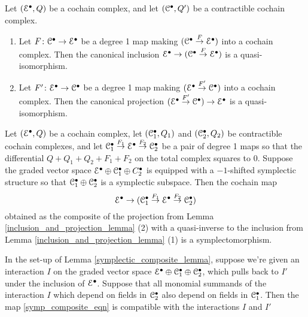 \documentclass[10pt, oneside]{article}
\begin{document}
\begin{lemma} \label{inclusion_and_projection_lemma}
Let $(\mathcal{E}^\bullet, Q)$ be a cochain complex, and let $(\mathcal{C}^\bullet, Q')$ be a contractible cochain complex.
\begin{enumerate}
 \item Let $F \colon \mathcal{C}^\bullet \to \mathcal{E}^\bullet$ be a degree 1 map making $(\mathcal{C}^\bullet \overset F\to \mathcal{E}^\bullet)$ into a cochain complex.  Then the canonical inclusion $\mathcal{E}^\bullet \to (\mathcal{C}^\bullet \overset F\to \mathcal{E}^\bullet)$ is a quasi-isomorphism.
 \item Let $F' \colon \mathcal{E}^\bullet \to \mathcal{C}^\bullet$ be a degree 1 map making $(\mathcal{E}^\bullet \overset {F'}\to \mathcal{C}^\bullet)$ into a cochain complex.  Then the canonical projection $(\mathcal{E}^\bullet \overset {F'}\to \mathcal{C}^\bullet) \to \mathcal{E}^\bullet$ is a quasi-isomorphism.
\end{enumerate}
\end{lemma}

\begin{lemma} \label{symplectic_composite_lemma}
Let $(\mathcal{E}^\bullet,Q)$ be a cochain complex, let $(\mathcal{C}_1^\bullet, Q_1)$ and $(\mathcal{C}_2^\bullet, Q_2)$ be contractible cochain complexes, and let $\mathcal{C}_1^\bullet \overset{F_1}\to \mathcal{E}^\bullet \overset{F_2}\to \mathcal{C}_2^\bullet$ be a pair of degree 1 maps so that the differential $Q + Q_1 + Q_2 + F_1 + F_2$ on the total complex squares to 0.  Suppose the graded vector space $\mathcal{E}^\bullet \oplus \mathcal{C}_1^\bullet \oplus C_2^\bullet$ is equipped with a $-1$-shifted symplectic structure so that $\mathcal{C}_1^\bullet \oplus \mathcal{C}_2^\bullet$ is a symplectic subspace.  Then the cochain map 
\begin{equation}
\label{symp_composite_eqn}\mathcal{E}^\bullet \to (\mathcal{C}_1^\bullet \overset{F_1}\to \mathcal{E}^\bullet \overset{F_2}\to \mathcal{C}_2^\bullet)
\end{equation}
obtained as the composite of the projection from Lemma \ref{inclusion_and_projection_lemma} (2) with a quasi-inverse to the inclusion from Lemma \ref{inclusion_and_projection_lemma} (1) is a symplectomorphism.
\end{lemma}

\begin{lemma} \label{interaction_pullback_lemma}
In the set-up of Lemma \ref{symplectic_composite_lemma}, suppose we're given an interaction $I$ on the graded vector space $\mathcal{E}^\bullet \oplus \mathcal{C}_1^\bullet \oplus \mathcal{C}_2^\bullet$, which pulls back to $I'$ under the inclusion of $\mathcal{E}^\bullet$.  Suppose that all monomial summands of the interaction $I$ which depend on fields in $\mathcal{C}_2^\bullet$ also depend on fields in $\mathcal{C}_1^\bullet$. Then the map \ref{symp_composite_eqn} is compatible with the interactions $I$ and $I'$
\end{lemma}
\end{document}
